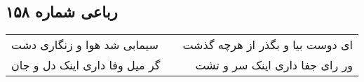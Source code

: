 \begin{center}
\section*{رباعی شماره ۱۵۸}
\label{sec:sh158}
\begin{longtable}{l p{0.5cm} r}
سیمابی شد هوا و زنگاری دشت
&&
ای دوست بیا و بگذر از هرچه گذشت
\\
گر میل وفا داری اینک دل و جان
&&
ور رای جفا داری اینک سر و تشت
\\
\end{longtable}
\end{center}
